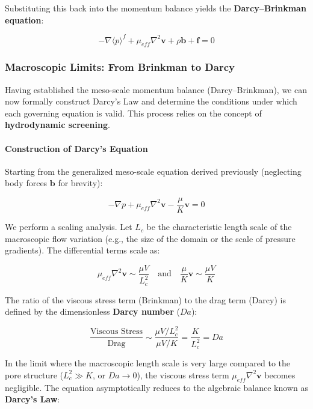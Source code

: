 Substituting this back into the momentum balance yields the \textbf{Darcy--Brinkman equation}:

\begin{equation}
    -\nabla \langle p \rangle^f + \mu_{eff} \nabla^2 \mathbf{v} + \rho \mathbf{b} + \mathbf{f} = 0
\end{equation}

\subsubsection{Macroscopic Limits: From Brinkman to Darcy}

Having established the meso-scale momentum balance (Darcy--Brinkman), we can now formally construct Darcy's Law and determine the conditions under which each governing equation is valid.
This process relies on the concept of \textbf{hydrodynamic screening}.

\paragraph{Construction of Darcy's Equation}
Starting from the generalized meso-scale equation derived previously (neglecting body forces $\mathbf{b}$ for brevity):

\begin{equation}
    -\nabla p + \mu_{eff} \nabla^2 \mathbf{v} - \frac{\mu}{K} \mathbf{v} = 0
\end{equation}

We perform a scaling analysis.
Let $L_c$ be the characteristic length scale of the macroscopic flow variation (e.g., the size of the domain or the scale of pressure gradients).
The differential terms scale as:

\begin{equation}
    \mu_{eff} \nabla^2 \mathbf{v} \sim \frac{\mu V}{L_c^2} \quad \text{and} \quad \frac{\mu}{K} \mathbf{v} \sim \frac{\mu V}{K}
\end{equation}

The ratio of the viscous stress term (Brinkman) to the drag term (Darcy) is defined by the dimensionless \textbf{Darcy number} ($Da$):

\begin{equation}
    \frac{\text{Viscous Stress}}{\text{Drag}} \sim \frac{\mu V / L_c^2}{\mu V / K} = \frac{K}{L_c^2} = Da
\end{equation}

In the limit where the macroscopic length scale is very large compared to the pore structure ($L_c^2 \gg K$, or $Da \to 0$), the viscous stress term $\mu_{eff} \nabla^2 \mathbf{v}$ becomes negligible.
The equation asymptotically reduces to the algebraic balance known as \textbf{Darcy's Law}:

